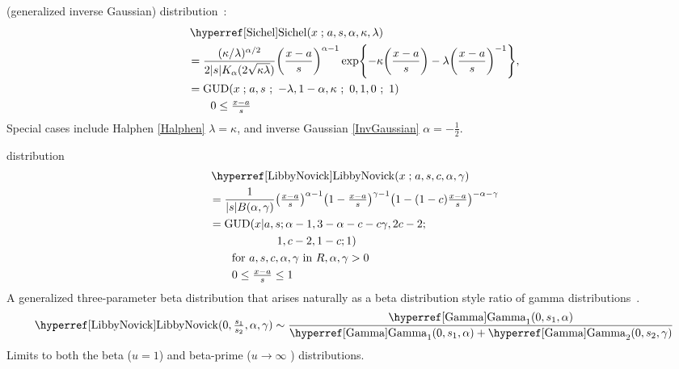  (generalized inverse Gaussian) distribution~\cite{Good1953, Sichel1973, Barndorff-Nielsen1977}:
\begin{align}
\label{Sichel}
&\opr{Sichel}(x\given a,s, \alpha, \kappa, \lambda) 
\\
&= \frac{(\kappa/\lambda)^{\alpha/2} }{2 |s| K_{\alpha} (2\sqrt{\kappa\lambda})} \Left(\frac{x-a}{s}\Right)^{\alpha-1} 
\exp\Left\{-\kappa \Left(\frac{x-a}{s}\Right) -\lambda \Left(\frac{x-a}{s}\Right)^{-1}\Right\},
\notag
\checked
\\
& = \op{GUD}(x \given a,s \sep -\lambda, 1-\alpha , \kappa \sep 0,1,0 \sep 1)
\notag
\\& \qquad  0 \leq \tfrac{x-a}{s} \notag
\end{align}
Special cases include Halphen \eqref{Halphen} $\lambda= \kappa$, and inverse Gaussian \eqref{InvGaussian} $\alpha = -\tfrac{1}{2}$.




 distribution~\cite{Libby1982a, McDonald1995, Sarabia2006, Nadarajah2007}
\begin{align}
\label{LibbyNovick}
&\opr{LibbyNovick}(x\given a,s,c,\alpha,\gamma) 
\\ \notag
&=  \frac{1}{|s| B(\alpha,\gamma)}
\Left(\tfrac{x-a}{s}\Right)^{\alpha-1}  \Left(1-\tfrac{x-a}{s}\Right)^{\gamma-1} \Left(1- (1-c) \tfrac{x-a}{s}\Right)^{-\alpha-\gamma}
\checked
\notag
\\ \notag
& = \op{GUD}(x|a,s; \alpha-1, 3-\alpha - c - c\gamma, 2c-2; 
\\ \notag & \qquad\qquad\qquad 1, c-2, 1-c;1) \checked
\\ \notag
& \qquad \text{for } a,s,c,\alpha,\gamma  \text{ in } {R},  \alpha,\gamma  >0
\\ \notag
& \qquad 0\leq \tfrac{x-a}{s} \leq1
\end{align}
A generalized three-parameter beta distribution that arises naturally as a beta distribution style ratio of gamma distributions~\cite{Sarabia2006}. 
\[
\opr{LibbyNovick}(0, \tfrac{s_1}{s_2}, \alpha, \gamma) \sim \frac{\opr{Gamma}_1(0, s_1,\alpha)} { \opr{Gamma}_1(0, s_1,\alpha) + \opr{Gamma}_2(0, s_2,\gamma) }
\notag
\checked
\]
Limits to both the beta ($u=1$) and beta-prime ($u\rightarrow \infty$ ) distributions. 

